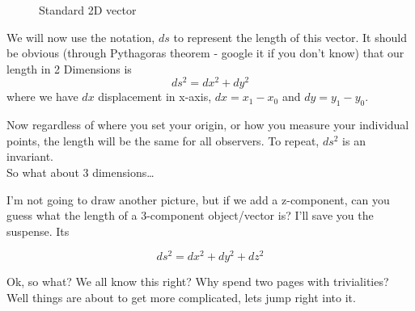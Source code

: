 \begin{figure}[h]
  \centering
{}
\caption{Standard 2D vector}
\label{fig:2dvec}
\end{figure}

We will now use the notation, $ds$ to represent the length of this vector. It should be obvious (through Pythagoras theorem - google it if you don't know) that our length in 2 Dimensions is
\begin{equation}
  ds^2 = dx^2 + dy^2
\end{equation}
where we have $dx$ displacement in x-axis, $dx = x_1 - x_0$ and $dy = y_1 - y_0$.  

Now regardless of where you set your origin, or how you measure your individual points, the length will be the same for all observers. To repeat, $ds^2$ is an invariant. \\

So what about 3 dimensions\ldots 

I'm not going to draw another picture, but if we add a z-component, can you guess what the length of a 3-component object/vector is? I'll save you the suspense. Its

\begin{equation}
  ds^2 = dx^2 + dy^2 + dz^2
\end{equation}

Ok, so what? We all know this right? Why spend two pages with trivialities? Well things are about to get more complicated, lets jump right into it. 

